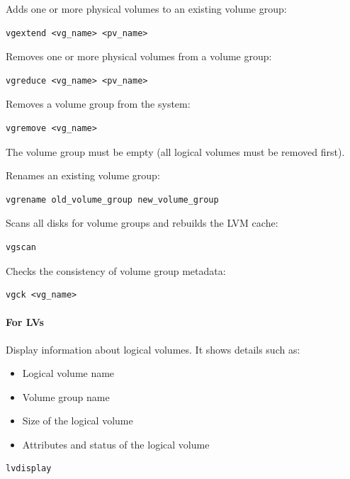 \documentclass{article}
\newenvironment{blocktemplateIII}[1]{%
    \tcolorbox[beamer,%
    noparskip,breakable,
    ,colframe=Red,%
    colbacklower=LimeGreen!75!LightGreen,%
    title=#1]}%
    {\endtcolorbox}
\newenvironment{codetemplate}[1][]{%
  \mybasecolorbox[#1]
  \itshape
}{%
  \endmybasecolorbox
}
\begin{document}
Adds one or more physical volumes to an existing volume group:
\begin{codetemplate}
\begin{verbatim}
vgextend <vg_name> <pv_name>
\end{verbatim}
\end{codetemplate}

Removes one or more physical volumes from a volume group:
\begin{codetemplate}
\begin{verbatim}
vgreduce <vg_name> <pv_name>
\end{verbatim}
\end{codetemplate}
    
Removes a volume group from the system: 
\begin{codetemplate}
\begin{verbatim}
vgremove <vg_name>
\end{verbatim}
\end{codetemplate}

\begin{blocktemplateIII}{Warning}
The volume group must be empty (all logical volumes must be removed first).
\end{blocktemplateIII}

Renames an existing volume group:
\begin{codetemplate}
\begin{verbatim}
vgrename old_volume_group new_volume_group
\end{verbatim}
\end{codetemplate}

Scans all disks for volume groups and rebuilds the LVM cache:
\begin{codetemplate}
\begin{verbatim}
vgscan
\end{verbatim}
\end{codetemplate}

Checks the consistency of volume group metadata:
\begin{codetemplate}
\begin{verbatim}
vgck <vg_name>
\end{verbatim}
\end{codetemplate}

\paragraph{For LVs}

Display information about logical volumes. It shows details such as:
\begin{itemize}
    \item Logical volume name
    \item Volume group name
    \item Size of the logical volume
    \item Attributes and status of the logical volume
\end{itemize}
\begin{codetemplate}
\begin{verbatim}
lvdisplay
\end{verbatim}
\end{codetemplate}
\end{document}

